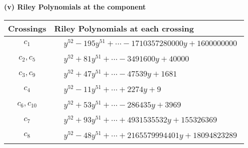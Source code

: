 \documentclass[1p]{elsarticle_modified}
\theoremstyle{definition}
\begin{document}
\newpage\renewcommand{\arraystretch}{1}
\flushleft \textbf{(v) Riley Polynomials at the component}\newline \\
\begin{tabular}{m{50pt}|m{274pt}}
Crossings & \hspace{64pt}Riley Polynomials at each crossing \\
\hline $$\begin{aligned}c_{1}\end{aligned}$$&$\begin{aligned}
&y^{52}-195 y^{51}+\cdots-1710357280000 y+1600000000
\end{aligned}$\\
\hline $$\begin{aligned}c_{2},c_{5}\end{aligned}$$&$\begin{aligned}
&y^{52}+81 y^{51}+\cdots-3491600 y+40000
\end{aligned}$\\
\hline $$\begin{aligned}c_{3},c_{9}\end{aligned}$$&$\begin{aligned}
&y^{52}+47 y^{51}+\cdots-47539 y+1681
\end{aligned}$\\
\hline $$\begin{aligned}c_{4}\end{aligned}$$&$\begin{aligned}
&y^{52}-11 y^{51}+\cdots+2274 y+9
\end{aligned}$\\
\hline $$\begin{aligned}c_{6},c_{10}\end{aligned}$$&$\begin{aligned}
&y^{52}+53 y^{51}+\cdots-286435 y+3969
\end{aligned}$\\
\hline $$\begin{aligned}c_{7}\end{aligned}$$&$\begin{aligned}
&y^{52}+93 y^{51}+\cdots+4931535532 y+155326369
\end{aligned}$\\
\hline $$\begin{aligned}c_{8}\end{aligned}$$&$\begin{aligned}
&y^{52}-48 y^{51}+\cdots+2165579994401 y+18094823289
\end{aligned}$\\

\end{tabular}
\end{document}
